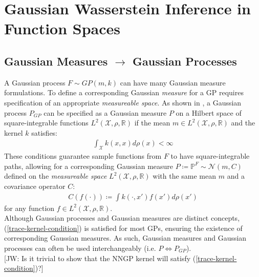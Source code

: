 \documentclass[twoside,11pt]{article}
\newcommand{\jw}[1]{{\color{gray} [JW: #1]}}
\begin{document}
\section{Gaussian Wasserstein Inference in Function Spaces}
\subsection{Gaussian Measures $\rightarrow$ Gaussian Processes \cite{wild2022generalized}}
A Gaussian process $F \sim GP(m, k)$ can have many Gaussian measure formulations. To define a corresponding Gaussian \textit{measure} for a GP requires specification of an appropriate \textit{measureable space}. As shown in \cite{wild2022generalized}, a Gaussian process $P_{GP}$ can be specified as a Gaussian measure $P$ on a Hilbert space of square-integrable functions $L^2(\mathcal{X}, \rho, \mathbb{R})$ if the mean $m \in L^2(\mathcal{X}, \rho, \mathbb{R})$ and the kernel $k$ satisfies:
\begin{align}
    \int_{\mathcal{X}} k(x, x) d\rho(x) < \infty
    \label{trace-kernel-condition}
\end{align}
These conditions guarantee sample functions from $F$ to have square-integrable paths, allowing for a corresponding Gaussian measure $P \coloneqq \mathbb{P}^F \sim \mathcal{N}(m, C)$ defined on the \textit{measureable space} $L^2(\mathcal{X}, \rho, \mathbb{R})$ with the same mean $m$ and a covariance operator $C$:
\begin{align}
    C(f(\cdot)) \coloneqq \int k(\cdot, x')f(x')d \rho(x')
    \label{gm-covariance-operator}
\end{align}
for any function $f \in L^2(\mathcal{X}, \rho, \mathbb{R})$. \\
\newline 
Although Gaussian processes and Gaussian measures are distinct concepts, (\ref{trace-kernel-condition}) is satisfied for most GPs, ensuring the existence of corresponding Gaussian measures. As such, Gaussian measures and Gaussian processes can often be used interchangeably (i.e. $P \Leftrightarrow P_{GP}$). %
\\\jw{Is it trivial to show that the NNGP kernel will satisfy (\ref{trace-kernel-condition})?}
\end{document}
